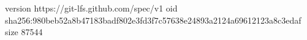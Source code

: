 version https://git-lfs.github.com/spec/v1
oid sha256:980beb52a8b47183badf802e3fd3f7c57638e24893a2124a69612123a8c3edaf
size 87544
